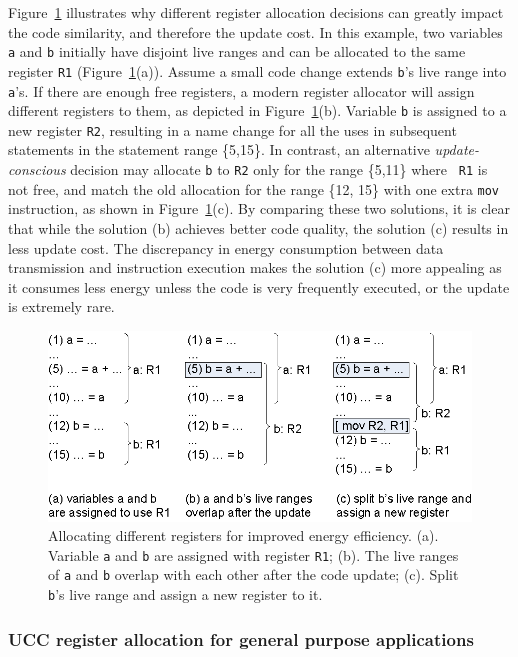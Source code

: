 Figure~\ref{freg0} illustrates why different register
allocation decisions can greatly impact the code similarity, and therefore the
update cost. In this example, two variables {\tt a} and {\tt b}
initially have disjoint live ranges and can be allocated to the same
register {\tt R1} (Figure~\ref{freg0}(a)). Assume a small code change
extends {\tt b}'s live range into {\tt a}'s. If there are enough free
registers, a modern register allocator will assign different registers
to them, as depicted in Figure~\ref{freg0}(b).  Variable {\tt b} is
assigned to a new register {\tt R2}, resulting in a name change for
all the uses in subsequent statements in the statement range \{5,15\}.
In contrast, an alternative {\em update-conscious} decision may
allocate {\tt b} to {\tt R2} only for the range \{5,11\} where {\tt
R1} is not free, and match the old allocation for the range \{12, 15\}
with one extra {\tt mov} instruction, as shown in Figure~\ref{freg0}(c). By comparing these two solutions, it is clear that
while the solution (b) achieves better code quality, the solution (c)
results in less update cost. The discrepancy in energy consumption
between data transmission and instruction execution makes the solution
(c) more appealing as it consumes less energy unless the code is very
frequently executed, or the update is extremely rare.

\begin{figure}
\centering
\includegraphics[scale=1.2]{figures/freg.0.eps}
\caption{Allocating different registers for improved energy efficiency.
(a). Variable {\tt a} and {\tt b} are assigned with register {\tt R1};
(b). The live ranges of {\tt a} and {\tt b} overlap with each other after the code update;
(c). Split {\tt b}'s live range and assign a new register to it.}
\label{freg0}
\end{figure}


\subsubsection{UCC register allocation for general purpose applications}\label{secra}
%


